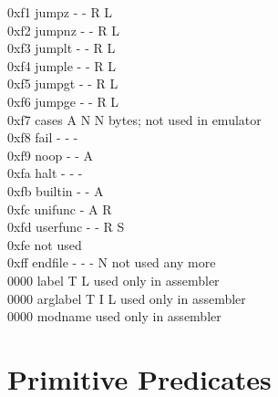 \documentclass[11pt]{article}
\begin{document}
\begin{tabbing}
0xf1  \> jumpz		\> - \> - \> R \> L \>   \>		\\
0xf2  \> jumpnz		\> - \> - \> R \> L \>   \>		\\
0xf3  \> jumplt		\> - \> - \> R \> L \>   \>		\\
0xf4  \> jumple		\> - \> - \> R \> L \>   \>		\\
0xf5  \> jumpgt		\> - \> - \> R \> L \>   \>		\\
0xf6  \> jumpge		\> - \> - \> R \> L \>   \>		\\
0xf7  \> cases		\> A \> N \> N \>   \>    bytes; not used in emulator \\
0xf8  \> fail		\> - \> - \> - \>   \>   \>		\\
0xf9  \> noop		\> - \> - \> A \>   \>   \>		\\
0xfa  \> halt		\> - \> - \> - \>   \>   \>		\\
0xfb  \> builtin	\> - \> - \> A \>   \>   \>		\\
0xfc  \> unifunc	\> - \> A \> R \>   \>	 \>		\\
0xfd  \> userfunc	\> - \> - \> R \> S \>   \>		\\
0xfe  \> 		\>   \>   \>   \>   \>   \> not used	\\
0xff  \> endfile	\> - \> - \> - \> N \>   \> not used any more	\\
0000  \> label		\> T \> L \>   \>   \>   \> used only in assembler \\
0000  \> arglabel	\> T \> I \> L \>   \>   \> used only in assembler \\
0000  \> modname	\>   \>   \>   \>   \>   \> used only in assembler \\
\end{tabbing}



\section		{Primitive Predicates}
\end{document}
